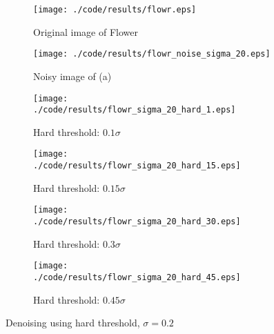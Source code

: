 \documentclass[journal,comsoc]{IEEEtran}
\begin{document}
\begin{figure}[!hbt]
  \centering
  \begin{subfigure}{.25\textwidth}
    \centering
    \texttt{[image: ./code/results/flowr.eps]}
    \caption{Original image of Flower}
    \label{subfig:original-image-of-flower}
  \end{subfigure}%
  \begin{subfigure}{.25\textwidth}
    \centering
    \texttt{[image: ./code/results/flowr\_noise\_sigma\_20.eps]}
    \caption{Noisy image of (a)}
    \label{subfig:flower-sigma-10-noisy-image-of-a}
  \end{subfigure}

  \begin{subfigure}{0.25\textwidth}
    \centering{}
    \texttt{[image: ./code/results/flowr\_sigma\_20\_hard\_1.eps]}
    \caption{Hard threshold: $0.1\sigma$}
  \end{subfigure}%
  \begin{subfigure}{.25\textwidth}
    \centering{}
    \texttt{[image: ./code/results/flowr\_sigma\_20\_hard\_15.eps]}
    \caption{Hard threshold: $0.15\sigma$}
  \end{subfigure}

  \begin{subfigure}{0.25\textwidth}
    \centering{}
    \texttt{[image: ./code/results/flowr\_sigma\_20\_hard\_30.eps]}
    \caption{Hard threshold: $0.3\sigma$}
  \end{subfigure}%
  \begin{subfigure}{.25\textwidth}
    \centering{}
    \texttt{[image: ./code/results/flowr\_sigma\_20\_hard\_45.eps]}
    \caption{Hard threshold: $0.45\sigma$}
  \end{subfigure}
  
  \caption{Denoising using hard threshold, $\sigma=0.2$}
  \label{fig:flower-sigma-20-hard-threshold}
\end{figure}
\end{document}
